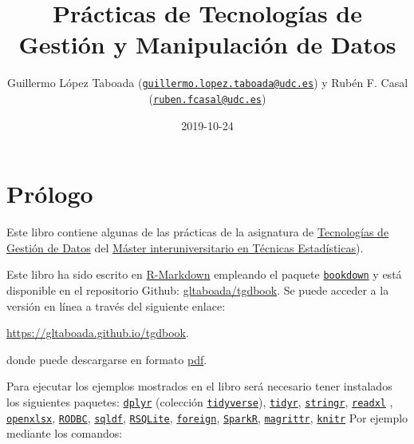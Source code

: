 \documentclass[]{book}
\title{Prácticas de Tecnologías de Gestión y Manipulación de Datos}
\author{Guillermo López Taboada (\href{mailto:guillermo.lopez.taboada@udc.es}{\nolinkurl{guillermo.lopez.taboada@udc.es}}) y Rubén F. Casal (\href{mailto:ruben.fcasal@udc.es}{\nolinkurl{ruben.fcasal@udc.es}})}
\date{2019-10-24}
\begin{document}
\maketitle

{
\setcounter{tocdepth}{1}
\tableofcontents
}
\hypertarget{prologo}{%
\chapter*{Prólogo}\label{prologo}}

Este libro contiene algunas de las prácticas de la asignatura de \href{http://eamo.usc.es/pub/mte/index.php/es/?option=com_content\&view=article\&id=2202\&idm=38\&a\%C3\%B1o=2019}{Tecnologías de Gestión de Datos} del \href{http://eio.usc.es/pub/mte}{Máster interuniversitario en Técnicas Estadísticas}).

Este libro ha sido escrito en \href{http://rmarkdown.rstudio.com}{R-Markdown} empleando el paquete \href{https://bookdown.org/yihui/bookdown/}{\texttt{bookdown}} y está disponible en el repositorio Github: \href{https://github.com/gltaboada/tgdbook}{gltaboada/tgdbook}.
Se puede acceder a la versión en línea a través del siguiente enlace:

\url{https://gltaboada.github.io/tgdbook}.

donde puede descargarse en formato \href{https://gltaboada.github.io/tgdbook/Practicas_de_TGD.pdf}{pdf}.

Para ejecutar los ejemplos mostrados en el libro será necesario tener instalados los siguientes paquetes:
\href{https://dplyr.tidyverse.org}{\texttt{dplyr}} (colección \href{https://www.tidyverse.org/}{\texttt{tidyverse}}),
\href{https://tidyr.tidyverse.org}{\texttt{tidyr}},
\href{https://stringr.tidyverse.org}{\texttt{stringr}},
\href{https://readxl.tidyverse.org}{\texttt{readxl}} ,
\href{https://cran.r-project.org/web/packages/openxlsx/index.html}{\texttt{openxlsx}}, \href{https://cran.r-project.org/web/packages/RODBC/index.html}{\texttt{RODBC}},
\href{https://cran.r-project.org/web/packages/sqldf/index.html}{\texttt{sqldf}},
\href{https://r-dbi.github.io/RSQLite}{\texttt{RSQLite}},
\href{https://cran.r-project.org/web/packages/foreign/index.html}{\texttt{foreign}},
\href{https://cran.r-project.org/web/packages/SparkR/index.html}{\texttt{SparkR}},
\href{https://cran.r-project.org/web/packages/magrittr/index.html}{\texttt{magrittr}},
\href{https://yihui.name/knitr}{\texttt{knitr}}
Por ejemplo mediante los comandos:
\end{document}
